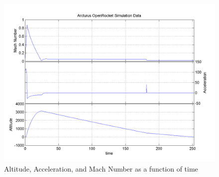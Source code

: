 \documentclass[]{article}
\begin{document}
\begin{figure}[htbp]
\centering
\includegraphics{images/plots/arcturus_openrocket_plot.png}
\caption{Altitude, Acceleration, and Mach Number as a function of time
\label{arcturus_openrocket_plot_label}}
\end{figure}

\clearpage

\printbibliography
\end{document}
